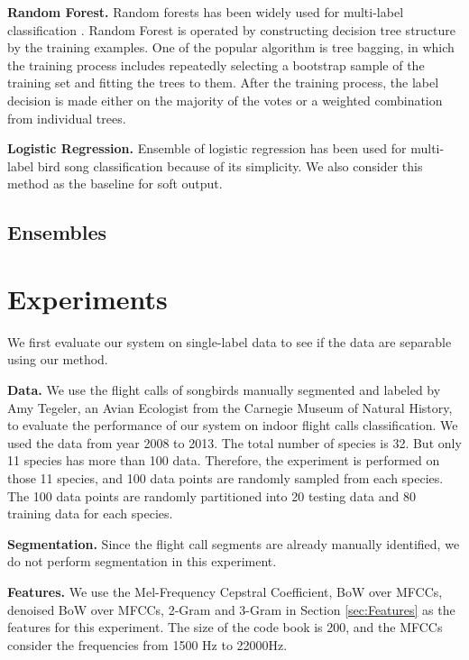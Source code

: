 \documentclass{article} %
\begin{document}

\textbf{Random Forest.} Random forests has been widely used for multi-label classification \cite{Lasseck13, chennovel13, Stowell_NIPSW13, Zhang_SDM2010}.
Random Forest is operated by constructing decision tree structure by the training examples. One of the popular algorithm is tree bagging, in which the training process includes repeatedly selecting a bootstrap sample of the training set and  fitting the trees to them. After the training process, the label decision is made either on the majority of the votes or a weighted combination from individual trees.


\textbf{Logistic Regression.} Ensemble of logistic regression has been used for multi-label bird song classification \cite{Massaron13} because of its simplicity. We also consider this method as the baseline for soft output.

\subsection{Ensembles}



\section{Experiments}

We first evaluate our system on single-label data to see if the data are separable using our method.

\textbf{Data.}  We use the flight calls of songbirds manually segmented and labeled by Amy Tegeler, an Avian Ecologist from the Carnegie Museum of Natural History, to evaluate the performance of our system on indoor flight calls classification. We used the data from year 2008 to 2013. The total number of species is 32. But only 11 species has more than 100 data. Therefore, the experiment is performed on those 11 species, and 100 data points are randomly sampled from each species. The 100 data points are randomly partitioned into 20 testing data and 80 training data for each species.

\textbf{Segmentation.}
Since the flight call segments are already manually identified, we do not perform segmentation in this experiment.

\textbf{Features.}
We use the Mel-Frequency Cepstral Coefficient, BoW over MFCCs, denoised BoW over MFCCs, 2-Gram and 3-Gram in Section \ref{sec:Features} as the features for this experiment. The size of the code book is 200, and the MFCCs consider the frequencies from 1500 Hz to 22000Hz.
\end{document}
